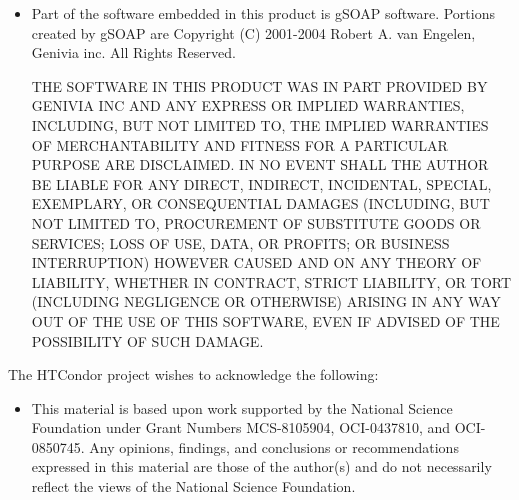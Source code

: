 \begin{itemize}
\item
Part of the software embedded in this product is gSOAP software.
Portions created by gSOAP are Copyright (C) 2001-2004 Robert A. van Engelen, Genivia inc. All Rights Reserved.

THE SOFTWARE IN THIS PRODUCT WAS IN PART PROVIDED BY GENIVIA INC AND ANY EXPRESS OR IMPLIED WARRANTIES, INCLUDING, BUT NOT LIMITED TO, THE IMPLIED WARRANTIES OF MERCHANTABILITY AND FITNESS FOR A PARTICULAR PURPOSE ARE DISCLAIMED. IN NO EVENT SHALL THE AUTHOR BE LIABLE FOR ANY DIRECT, INDIRECT, INCIDENTAL, SPECIAL, EXEMPLARY, OR CONSEQUENTIAL DAMAGES (INCLUDING, BUT NOT LIMITED TO, PROCUREMENT OF SUBSTITUTE GOODS OR SERVICES; LOSS OF USE, DATA, OR PROFITS; OR BUSINESS INTERRUPTION) HOWEVER CAUSED AND ON ANY THEORY OF LIABILITY, WHETHER IN CONTRACT, STRICT LIABILITY, OR TORT (INCLUDING NEGLIGENCE OR OTHERWISE) ARISING IN ANY WAY OUT OF THE USE OF THIS SOFTWARE, EVEN IF ADVISED OF THE POSSIBILITY OF SUCH DAMAGE.

\end{itemize}

The HTCondor project wishes to acknowledge the following:

\begin{itemize}

\item This material is based upon work supported by the 
National Science Foundation under Grant Numbers
MCS-8105904, OCI-0437810, and OCI-0850745. 
Any opinions, findings, and conclusions or recommendations expressed 
in this material are those of the author(s) and do not necessarily 
reflect the views of the National Science Foundation.

\end{itemize}
